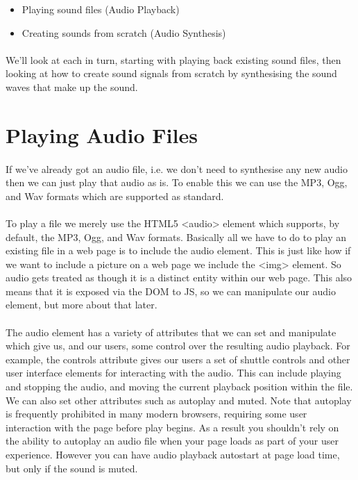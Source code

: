 \begin{itemize}
\item Playing sound files (Audio Playback)
\item Creating sounds from scratch (Audio Synthesis)
\end{itemize}

\paragraph{} We'll look at each in turn, starting with playing back existing sound files, then looking at how to create sound signals from scratch by synthesising the sound waves that make up the sound.

\section{Playing Audio Files}

\paragraph{} If we’ve already got an audio file, i.e. we don't need to synthesise any new audio then we can just play that audio as is. To enable this we can use the MP3, Ogg, and Wav formats which are supported as standard.
\paragraph{} To play a file we merely use the HTML5 <audio> element which supports, by default, the MP3, Ogg, and Wav formats. Basically all we have to do to play an existing file in a web page is to include the audio element. This is just like how if we want to include a picture on a web page we include the <img> element. So audio gets treated as though it is a distinct entity within our web page. This also means that it is exposed via the DOM to JS, so we can manipulate our audio element, but more about that later.
\paragraph{} The audio element has a variety of attributes that we can set and manipulate which give us, and our users, some control over the resulting audio playback. For example, the controls attribute gives our users a set of shuttle controls and other user interface elements for interacting with the audio. This can include playing and stopping the audio, and moving the current playback position within the file. We can also set other attributes such as autoplay and muted. Note that autoplay is frequently prohibited in many modern browsers, requiring some user interaction with the page before play begins. As a result you shouldn't rely on the ability to autoplay an audio file when your page loads as part of your user experience. However you can have audio playback autostart at page load time, but only if the sound is muted.

